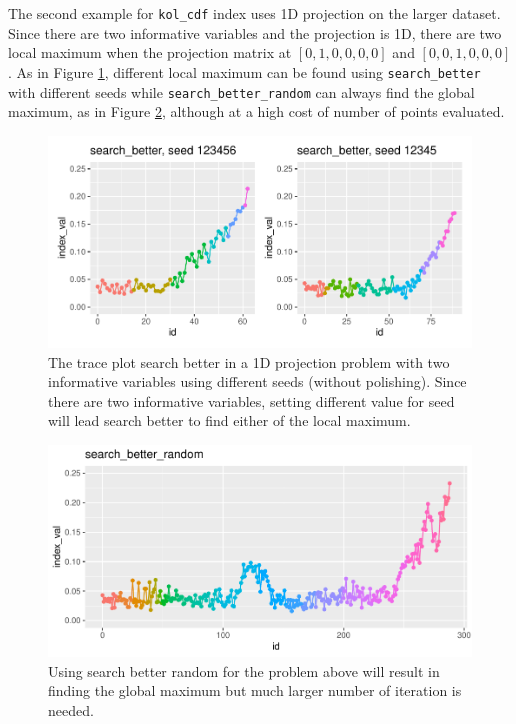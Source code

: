 \documentclass[12pt]{article}
\begin{document}
The second example for \texttt{kol\_cdf} index uses 1D projection on the
larger dataset. Since there are two informative variables and the
projection is 1D, there are two local maximum when the projection matrix
at \([0, 1, 0, 0, 0, 0]\) and \([0, 0, 1 ,0, 0, 0]\). As in Figure
\ref{1d-2var-different-seeds}, different local maximum can be found
using \texttt{search\_better} with different seeds while
\texttt{search\_better\_random} can always find the global maximum, as
in Figure \ref{1d-2var-better-random}, although at a high cost of number
of points evaluated.

\begin{figure}
\centering
\includegraphics{paper_files/figure-latex/1d-2var-different-seeds-1.pdf}
\caption{\label{1d-2var-different-seeds}The trace plot search better in
a 1D projection problem with two informative variables using different
seeds (without polishing). Since there are two informative variables,
setting different value for seed will lead search better to find either
of the local maximum.}
\end{figure}

\begin{figure}
\centering
\includegraphics{paper_files/figure-latex/1d-2var-better-random-1.pdf}
\caption{\label{1d-2var-better-random}Using search better random for the
problem above will result in finding the global maximum but much larger
number of iteration is needed.}
\end{figure}
\end{document}
